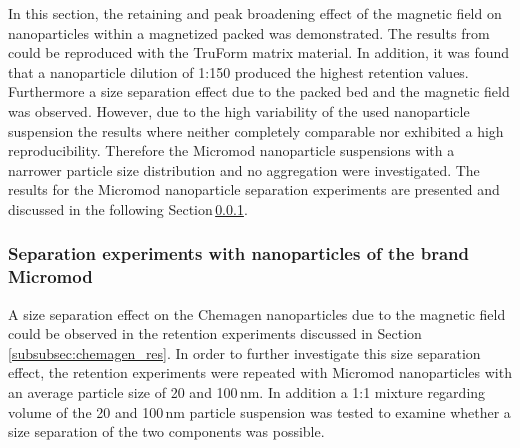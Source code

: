 In this section, the retaining and peak broadening effect of the magnetic field on nanoparticles within a magnetized packed was demonstrated. The results from \cite{AndreMaster} could be reproduced with the TruForm matrix material. In addition, it was found that a nanoparticle dilution of 1:150 produced the highest retention values. Furthermore a size separation effect due to the packed bed and the magnetic field was observed. However, due to the high variability of the used nanoparticle suspension the results where neither completely comparable nor exhibited a high reproducibility. Therefore the Micromod nanoparticle suspensions with a narrower particle size distribution and no aggregation were investigated. The results for the Micromod nanoparticle separation experiments are presented and discussed in the following Section\,\ref{subsubsec:micromod_res}. 

\FloatBarrier  
\subsubsection{Separation experiments with nanoparticles of the brand Micromod}
\label{subsubsec:micromod_res}
A size separation effect on the Chemagen nanoparticles due to the magnetic field could be observed in the retention experiments discussed in Section\,\ref{subsubsec:chemagen_res}. In order to further investigate this size separation effect, the retention experiments were repeated with Micromod nanoparticles with an average particle size of 20 and 100\,nm. In addition a 1:1 mixture regarding volume of the 20 and 100\,nm particle suspension was tested to examine whether a size separation of the two components was possible. 

